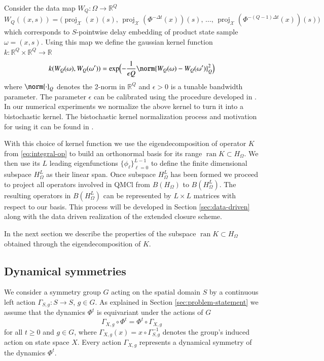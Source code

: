 \documentclass[letterpaper,10pt,3p,preprint]{elsarticle}
\newcommand{\Rbb}{\mathbb{R}}
\newcommand{\Xcal}{\mathcal{X}}
\DeclareMathOperator{\ran}{ran}
\DeclareMathOperator{\proj}{proj}
\begin{document}
Consider the data map $W_Q\colon\Omega\rightarrow\Rbb^Q$
\begin{equation}\label{eq:data-map}
    W_Q((x,s))=\bigl(\proj_\Xcal(x)(s),\,
        \proj_\Xcal(\Phi^{-\Delta t}(x))(s),\,\ldots,\,
        \proj_\Xcal(\Phi^{-(Q-1)\Delta t}(x))(s)\bigr)
\end{equation}
which corresponds to $S$-pointwise delay embedding of
product state sample $\omega=(x,s)$.
Using this map we define the gaussian kernel function
$k\colon\Rbb^Q\times\Rbb^Q\to\Rbb$
\begin{equation}\label{eq:data-kernel}
    k(W_Q(\omega),W_Q(\omega'))=\exp\Bigl(-\frac{1}{\epsilon Q}
        \norm{W_Q(\omega)-W_Q(\omega')}_Q^2\Bigr)
\end{equation}
where $\norm{\cdot}_Q$ denotes the 2-norm in $\Rbb^Q$ and
$\epsilon>0$ is a tunable bandwidth parameter.
The parameter $\epsilon$ can be calibrated using the procedure
developed in \cite{Coifman2008}.
In our numerical experiments we normalize the above kernel to turn it
into a bistochastic kernel.
The bistochastic kernel normalization process and motivation
for using it can be found in
\cite{Coifman2013,Das2021}.

With this choice of kernel function we use the eigendecomposition
of operator $K$ from \eqref{eq:integral-op} to build an orthonormal
basis for its range $\ran{K}\subset H_\Omega$.
We then use its $L$ leading eigenfunctions
$\{\phi_\ell\}_{\ell=0}^{L-1}$
to define the finite dimensional subspace
$H_{\Omega}^L$ as their linear span.
Once subspace $H_\Omega^L$ has been formed we proceed to project
all operators involved in QMCl from $B(H_\Omega)$
to $B(H_\Omega^L)$.
The resulting operators in $B(H_\Omega^L)$ can be represented
by $L\times L$ matrices with respect to our basis.
This process will be developed in Section
\ref{sec:data-driven}
along with the data driven realization of the extended
closure scheme.

In the next section we describe the properties of the subspace
$\ran{K}\subset H_\Omega$ obtained through the
eigendecomposition of $K$.

\subsection{Dynamical symmetries}\label{sec:dyn-symmetries}
We consider a symmetry group $G$ acting on the spatial domain $S$
by a continuous left action
$\Gamma_{S,g}\colon S\rightarrow S$, $g\in G$.
As explained in Section \ref{sec:problem-statement}
we assume that the dynamics $\Phi^t$ is equivariant under
the actions of $G$
\begin{equation*}
    \Gamma_{X,g}\circ\Phi^t=\Phi^t\circ\Gamma_{X,g}
\end{equation*}
for all $t\geq 0$ and $g\in G$, where
$\Gamma_{X,g}(x)=x\circ\Gamma_{S,g}^{-1}$
denotes the group's induced action on state space $X$.
Every action $\Gamma_{X,g}$ represents a dynamical symmetry
of the dynamics $\Phi^t$.
\end{document}
